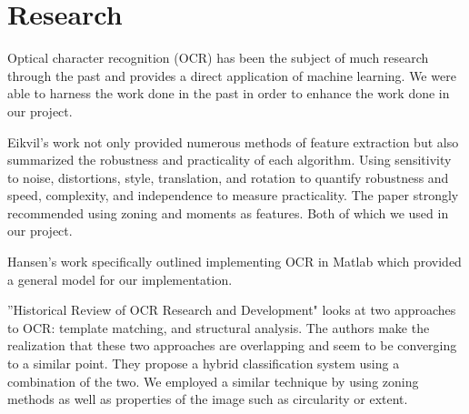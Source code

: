 \section{Research}

Optical character recognition (OCR) has been the subject of much research through the past and provides a direct application of machine learning. We were able to harness the work done in the past in order to enhance the work done in our project. 

Eikvil's work \cite{one} not only provided numerous methods of feature extraction but also summarized the robustness and practicality of each algorithm. Using sensitivity to noise, distortions, style, translation, and rotation to quantify robustness and speed, complexity, and independence to measure practicality. The paper strongly recommended using zoning and moments as features. Both of which we used in our project.

Hansen's work \cite{two} specifically outlined implementing OCR in Matlab which provided a general model for our implementation.

''Historical Review of OCR Research and Development" \cite{three} looks at two approaches to OCR: template matching, and structural analysis. The authors make the realization that these two approaches are overlapping and seem to be converging to a similar point. They propose a hybrid classification system using a combination of the two. We employed a similar technique by using zoning methods as well as properties of the image such as circularity or extent.